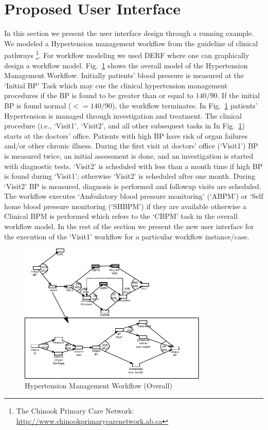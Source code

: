 \documentclass[a4paper]{llncs}
\begin{document}
\section{Proposed User Interface}\label{label:proposal}
In this section we present the user interface design through a running example. 
We modeled a Hypertension management workflow from the guideline of clinical pathways \footnote{The Chinook Primary Care Network: \url{http://www.chinookprimarycarenetwork.ab.ca}}. 
For workflow modeling we used DERF where one can graphically design a workflow model. 
Fig.~\ref{fig:htnoverall} shows the overall model of the Hypertension Management Workflow. 
Initially patients' blood pressure is measured at the `Initial BP' Task which may cue the clinical hypertension management procedures if the BP is found to be greater than or equal to $140/90$. 
If the initial BP is found normal ($<=140/90$), the workflow terminates. 
In Fig.~\ref{fig:htnoverall} patients' Hypertension is managed through investigation and treatment. 
The clinical procedure (i.e., `Visit1', `Visit2', and all other subsequest tasks in In Fig.~\ref{fig:htnoverall}) starts at the doctors' office. 
Patients with high BP have risk of organ failures and/or other chronic illness. 
During the first visit at doctors' office (`Visit1') BP is measured twice, an initial assessment is done, and an investigation is started with diagnostic tests. 
`Visit2' is scheduled with less than a month time if high BP is found during `Visit1'; otherwise `Visit2' is scheduled after one month. 
During `Visit2' BP is measured, diagnosis is performed and followup visits are scheduled. 
The workflow executes `Ambulatory blood pressure monitoring' (`ABPM') or `Self home blood pressure monitoring (`SHBPM') if they are available otherwise a Clinical BPM is performed which refers to 
the `CBPM' task in the overall workflow model.
In the rest of the section we present the new user interface for the execution of the `Visit1' workflow for a particular workflow instance/case. 


\begin{figure}
  \begin{center}
    \includegraphics[width=0.8\textwidth]{bp.pdf}
    \caption{Hypertension Management Workflow (Overall)}
    \label{fig:htnoverall}
  \end{center}
\end{figure}
\end{document}
